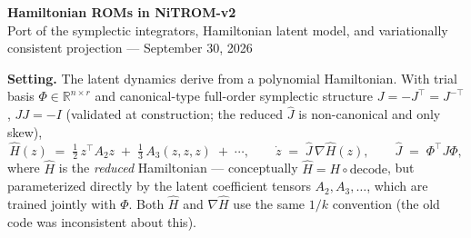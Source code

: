 \documentclass[10pt]{article}
\newcommand{\Jhat}{\hat{J}}
\newcommand{\Hhat}{\hat{H}}
\begin{document}
\begin{center}
    {\LARGE\bfseries Hamiltonian ROMs in NiTROM-v2}\\[2pt]
    {\small Port of the symplectic integrators, Hamiltonian latent model, and
    variationally consistent projection --- September 30, 2026}
\end{center}

\textbf{Setting.}\; The latent dynamics derive from a polynomial Hamiltonian.
With trial basis $\Phi \in \mathbb{R}^{n\times r}$ and canonical-type
full-order symplectic structure $J = -J^\top = J^{-\top}$, $JJ = -I$
(validated at construction; the reduced $\Jhat$ is non-canonical and only
skew),
\begin{equation*}
    \Hhat(z) \;=\; \tfrac12\, z^\top A_2 z \;+\; \tfrac13\, A_3(z,z,z) \;+\;\cdots,
    \qquad
    \dot z \;=\; \Jhat\,\nabla \Hhat(z),
    \qquad
    \Jhat \;=\; \Phi^\top J \Phi ,
\end{equation*}
where $\Hhat$ is the \emph{reduced} Hamiltonian --- conceptually
$\Hhat = H \circ \mathrm{decode}$, but parameterized directly by the latent
coefficient tensors $A_2, A_3, \dots$, which are trained jointly with
$\Phi$. Both $\Hhat$ and $\nabla \Hhat$ use the same $1/k$ convention (the
old code was inconsistent about this).
\end{document}
